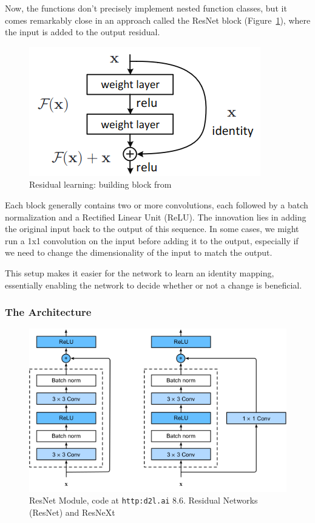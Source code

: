 \documentclass[11pt]{article}
\begin{document}
Now, the functions don't precisely implement nested function classes, but it comes remarkably close in an approach called the ResNet block (Figure~\ref{fig:resblock}), where the input is added to the output residual.

\begin{figure}[H]
    \centering
    \includegraphics[width=.5\linewidth]{figures/ResBlock.png}
    \caption{Residual learning: building block from~\cite{ResNet}}
    \label{fig:resblock}
\end{figure}

Each block generally contains two or more convolutions, each followed by a batch normalization and a Rectified Linear Unit (ReLU). The innovation lies in adding the original input back to the output of this sequence. In some cases, we might run a 1x1 convolution on the input before adding it to the output, especially if we need to change the dimensionality of the input to match the output.

This setup makes it easier for the network to learn an identity mapping, essentially enabling the network to decide whether or not a change is beneficial.



\subsubsection{The Architecture}

\begin{figure}[H]
    \centering
    \includegraphics[width=.5\linewidth]{figures/resnet-block.png}
    \caption{ResNet Module, code at \texttt{http:d2l.ai} 8.6. Residual Networks (ResNet) and ResNeXt}
\end{figure}
\end{document}
